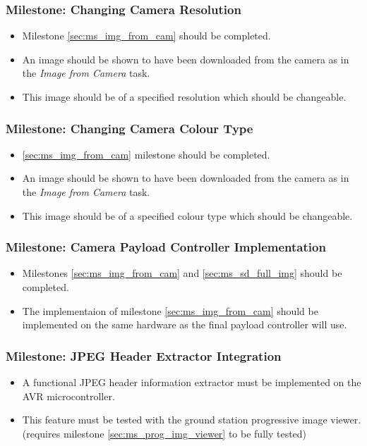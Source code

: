 	\subsubsection{Milestone: Changing Camera Resolution}
		\label{sec:ms_img_cam_change_res}
		\begin{itemize}
			\item 	Milestone \ref{sec:ms_img_from_cam} should be completed.
			\item 	An image should be shown to have been downloaded 
				from the camera as in the \emph{Image from Camera}
				task.
			\item 	This image should be of a specified resolution which
				should be changeable.
		\end{itemize}

	\subsubsection{Milestone: Changing Camera Colour Type}
		\label{sec:ms_img_cam_change_colour_type}
		\begin{itemize}
			\item 	\ref{sec:ms_img_from_cam} milestone should be completed.
			\item 	An image should be shown to have been downloaded 
				from the camera as in the \emph{Image from Camera}
				task.
			\item 	This image should be of a specified colour type which
				should be changeable.
		\end{itemize}

	\subsubsection{Milestone: Camera Payload Controller Implementation}
		\label{sec:ms_img_cam_controller_implementation}
		\begin{itemize}
			\item 	Milestones \ref{sec:ms_img_from_cam} and \ref{sec:ms_sd_full_img} should be completed.
			\item 	The implementaion of milestone \ref{sec:ms_img_from_cam} 
				should be implemented on the same hardware as the final
				payload controller will use.
		\end{itemize}

	\subsubsection{Milestone: JPEG Header Extractor Integration}
		\label{sec:ms_jpg_extractor}
		\begin{itemize}
			\item 	A functional JPEG header information extractor must be implemented
				on the AVR microcontroller. 
			\item 	This feature must be tested with
				the ground station progressive image viewer. (requires
				milestone \ref{sec:ms_prog_img_viewer} to be fully tested)
		\end{itemize}


